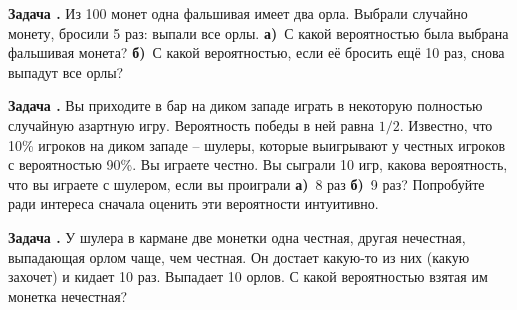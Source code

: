 \documentclass[11pt,a4paper]{article}
\newcounter{znum}
\newcommand{\z}[1]{\addtocounter{znum}{1} \textbf{Задача \arabic{znum}#1. }}
\renewcommand{\!}{\textcolor{red}{!}}
\begin{document}
\z{} Из 100 монет одна фальшивая имеет два орла. Выбрали случайно монету, бросили 5 раз: выпали все орлы. \textbf{а)}~С какой вероятностью была выбрана фальшивая монета? \textbf{б)}~С какой вероятностью, если её бросить ещё 10 раз, снова выпадут все орлы?

\z{} Вы приходите в бар на диком западе играть в некоторую полностью случайную азартную игру. Вероятность победы в ней равна $1/2$. Известно, что 10\% игроков на диком западе -- шулеры, которые выигрывают у честных игроков с вероятностью 90\%. Вы играете честно. Вы сыграли 10 игр, какова вероятность, что вы играете с шулером, если вы проиграли \textbf{а)}~8 раз \textbf{б)}~9 раз? Попробуйте ради интереса сначала оценить эти вероятности интуитивно.

\z{} У шулера в кармане две монетки одна честная, другая нечестная, выпадающая орлом чаще, чем честная. Он достает какую-то из них (какую захочет) и кидает 10 раз. Выпадает 10 орлов. С какой вероятностью взятая им монетка нечестная?
\end{document}
